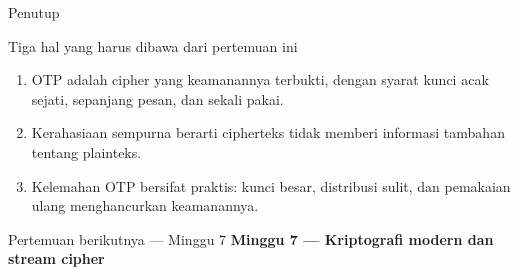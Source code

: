 \documentclass[aspectratio=169,11pt]{beamer}
\begin{document}
\begin{frame}{Penutup}
    \begin{block}{Tiga hal yang harus dibawa dari pertemuan ini}
        \begin{enumerate}
            \item OTP adalah cipher yang keamanannya terbukti, dengan syarat
                  kunci acak sejati, sepanjang pesan, dan sekali pakai.
            \item Kerahasiaan sempurna berarti cipherteks tidak memberi
                  informasi tambahan tentang plainteks.
            \item Kelemahan OTP bersifat praktis: kunci besar, distribusi
                  sulit, dan pemakaian ulang menghancurkan keamanannya.
        \end{enumerate}
    \end{block}
    \vspace{0.3cm}
    \begin{exampleblock}{Pertemuan berikutnya --- Minggu 7}
        \textbf{Minggu 7 --- Kriptografi modern dan stream cipher}
    \end{exampleblock}
\end{frame}
\end{document}
